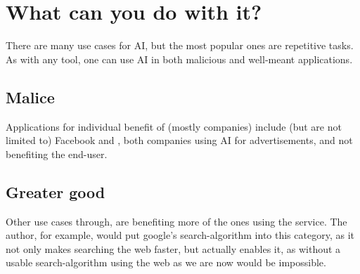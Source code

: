 \chapter{What can you do with it?}




There are many use cases for AI, but the most popular ones are repetitive tasks. As with any tool, one can use AI in both malicious and well-meant applications.
\section{Malice}
Applications for individual benefit of (mostly companies) include (but are not limited to) Facebook \cite{facebookWerbungAufInstagram} and \cite{googleOnlinewerbungLeichtGemacht}, both companies using AI for advertisements, and not benefiting the end-user.
\section{Greater good}
Other use cases through, are benefiting more of the ones using the service. The author, for example, would put google's search-algorithm \cite{googleFunktioniertGoogleSucheSuchalgorithmen} into this category, as it not only makes searching the web faster, but actually enables it, as without a usable search-algorithm using the web as we are now would be impossible.